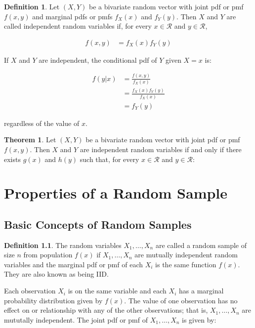 \documentclass[11pt,a4paper]{report}
\theoremstyle{definition}
\newtheorem{defn}{Definition}[section]
\theoremstyle{theorem}
\newtheorem{thm}{Theorem}[section]
\theoremstyle{example}
\begin{document}
\begin{defn}
  Let $(X, Y)$ be a bivariate random vector with joint pdf or pmf $f(x,y)$ and marginal pdfs or pmfs $f_X(x)$ and $f_Y(y)$.  Then $X$ and $Y$ are called independent random variables if, for every $x \in \mathcal{R}$ and $y \in \mathcal{R}$,

  \begin{align*}
    f(x,y) &= f_X(x) f_Y(y)
  \end{align*}

  If $X$ and $Y$ are independent, the conditional pdf of $Y$ given $X = x$ is:

  \begin{align*}
    f(y|x) &= \frac{f(x,y)}{f_X(x)} \\
    &= \frac{f_X(x) f_Y(y)}{f_X(x)} \\
    &= f_Y(y)
  \end{align*}

  regardless of the value of $x$.
\end{defn}

\begin{thm}
  Let $(X,Y)$ be a bivariate random vector with joint pdf or pmf $f(x,y)$.  Then $X$ and $Y$ are independent random variables if and only if there exists $g(x)$ and $h(y)$ such that, for every $x \in \mathcal{R}$ and $y \in \mathcal{R}$:
\end{thm}

\chapter{Properties of a Random Sample}

\section{Basic Concepts of Random Samples}

\begin{defn}
  The random variables $X_1, \dots, X_n$ are called a random sample of size $n$ from population $f(x)$ if $X_1, \dots, X_n$ are mutually independent random variables and the marginal pdf or pmf of each $X_i$ is the same function $f(x)$.  They are also known as being IID.
\end{defn}

Each observation $X_i$ is on the same variable and each $X_i$ has a marginal probability distribution given by $f(x)$.  The value of one observation has no effect on or relationship with any of the other observations; that is, $X_1, \dots, X_n$ are mututally independent.  The joint pdf or pmf of $X_1, \dots, X_n$ is given by:
\end{document}
